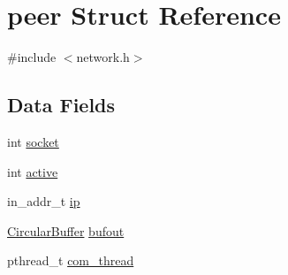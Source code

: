 \hypertarget{structpeer}{\section{peer Struct Reference}
\label{structpeer}
}


{\ttfamily \#include $<$network.\-h$>$}

\subsection*{Data Fields}
\begin{DoxyCompactItemize}
\item 
int \hyperlink{structpeer_a3666576f6b88007cc7b8f26c7da596c8}{socket}
\item 
int \hyperlink{structpeer_aa5805c5e936174e5092bf7a5b78e7e64}{active}
\item 
in\-\_\-addr\-\_\-t \hyperlink{structpeer_a576f19065d49f151479e4fd2df18670b}{ip}
\item 
\hyperlink{struct_circular_buffer}{Circular\-Buffer} \hyperlink{structpeer_a78b709e715ca837e65e67e5239799998}{bufout}
\item 
pthread\-\_\-t \hyperlink{structpeer_a9e2ccb9eb99322d3c6d4e025d1a46f53}{com\-\_\-thread}
\end{DoxyCompactItemize}


